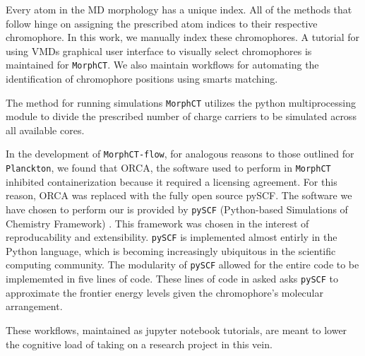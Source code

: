 Every atom in the MD morphology has a unique index. All of the methods that follow hinge on assigning the prescribed atom indices to their respective chromophore. 
In this work, we manually index these chromophores. A tutorial for using VMDs graphical user interface to
visually select chromophores is maintained for \texttt{MorphCT}.
We also maintain workflows for automating the identification of chromophore positions using smarts
matching.

The method for running  simulations 
\texttt{MorphCT} utilizes the python multiprocessing module to divide the prescribed number of charge carriers to be simulated across all available cores.

In the development of \texttt{MorphCT-flow}, for analogous reasons to those outlined for \texttt{Planckton}, we
found that ORCA, the software used to perform  in \texttt{MorphCT} inhibited containerization because it
required a licensing agreement. For this reason, ORCA was replaced with the fully open source pySCF. 
The software we have chosen to perform our  is
provided by \texttt{pySCF} (Python-based Simulations of Chemistry Framework) \cite{Sun2018a}. This framework
was chosen in the interest of reproducability and extensibility.
\texttt{pySCF} is implemented almost entirly in the Python 
language, which is becoming increasingly ubiquitous in the scientific computing community. The modularity of
\texttt{pySCF} allowed for the entire  code to be implememted in five lines of code. These lines of code in 
asked asks \texttt{pySCF} to approximate the frontier energy levels given the chromophore's molecular arrangement.  

These workflows, maintained as jupyter notebook tutorials, 
are meant to lower the cognitive load of taking on a research project in this vein. 


